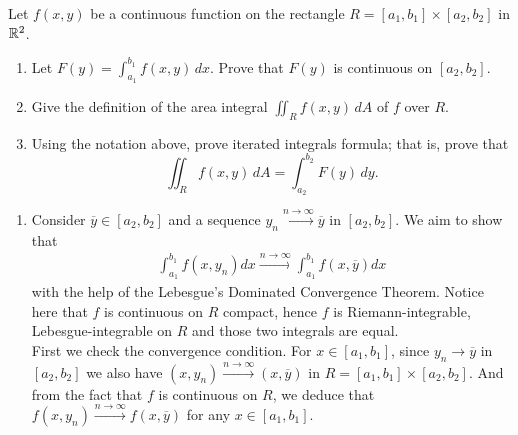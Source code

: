 \begin{problem}
Let $f(x,y)$ be a continuous function on the rectangle $R = [a_1, b_1] \times [a_2, b_2]$ in $\mathbb{R}^2$.
\begin{enumerate}
    \item[(a)] Let $F(y) = \int_{a_1}^{b_1} f(x,y) \,dx$. Prove that $F(y)$ is continuous on $[a_2, b_2]$.
    \item[(b)] Give the definition of the area integral $\iint_R f(x,y) \,dA$ of $f$ over $R$.
    \item[(c)] Using the notation above, prove iterated integrals formula; that is, prove that
    $$ \iint_R f(x,y) \,dA = \int_{a_2}^{b_2} F(y) \,dy. $$
\end{enumerate}
\begin{solution}
\begin{enumerate}
    \item[(a)] Consider $\overline{y}\in [a_2,b_2]$ and a sequence $y_n \xrightarrow{n\rightarrow\infty} \overline{y}$ in $[a_2,b_2]$. We aim to show that 
    \begin{align*}
        \displaystyle\int_{a_1}^{b_1} f(x,y_n)dx \xrightarrow{n\rightarrow\infty} \displaystyle\int_{a_1}^{b_1}f(x,\overline{y})dx
    \end{align*}
    with the help of the Lebesgue's Dominated Convergence Theorem. Notice here that $f$ is continuous on $R$ compact, hence $f$ is Riemann-integrable, Lebesgue-integrable on $R$ and those two integrals are equal. \\
    First we check the convergence condition. For $x\in [a_1,b_1]$, since $y_n \rightarrow \overline{y}$ in $[a_2,b_2]$ we also have $(x,y_n) \xrightarrow{n\rightarrow\infty} (x,\overline{y})$ in $R=[a_1,b_1]\times [a_2,b_2]$. And from the fact that $f$ is continuous on $R$, we deduce that $f(x,y_n) \xrightarrow{n\rightarrow\infty} f(x,\overline{y})$ for any $x\in [a_1,b_1]$. \\
    

\end{enumerate}
\end{solution}
\end{problem}
